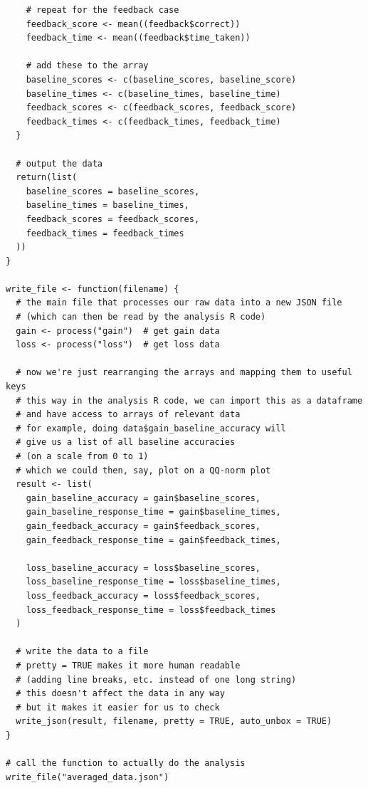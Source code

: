 \documentclass[12pt]{exam}
\begin{document}
\begin{verbatim}
    # repeat for the feedback case
    feedback_score <- mean((feedback$correct))
    feedback_time <- mean((feedback$time_taken))
    
    # add these to the array
    baseline_scores <- c(baseline_scores, baseline_score)
    baseline_times <- c(baseline_times, baseline_time)
    feedback_scores <- c(feedback_scores, feedback_score)
    feedback_times <- c(feedback_times, feedback_time)
  }
  
  # output the data
  return(list(
    baseline_scores = baseline_scores,
    baseline_times = baseline_times,
    feedback_scores = feedback_scores,
    feedback_times = feedback_times
  ))
}

write_file <- function(filename) {
  # the main file that processes our raw data into a new JSON file
  # (which can then be read by the analysis R code)
  gain <- process("gain")  # get gain data
  loss <- process("loss")  # get loss data
  
  # now we're just rearranging the arrays and mapping them to useful keys
  # this way in the analysis R code, we can import this as a dataframe
  # and have access to arrays of relevant data
  # for example, doing data$gain_baseline_accuracy will
  # give us a list of all baseline accuracies
  # (on a scale from 0 to 1)
  # which we could then, say, plot on a QQ-norm plot
  result <- list(
    gain_baseline_accuracy = gain$baseline_scores,
    gain_baseline_response_time = gain$baseline_times,
    gain_feedback_accuracy = gain$feedback_scores,
    gain_feedback_response_time = gain$feedback_times,
    
    loss_baseline_accuracy = loss$baseline_scores,
    loss_baseline_response_time = loss$baseline_times,
    loss_feedback_accuracy = loss$feedback_scores,
    loss_feedback_response_time = loss$feedback_times
  )
  
  # write the data to a file
  # pretty = TRUE makes it more human readable
  # (adding line breaks, etc. instead of one long string)
  # this doesn't affect the data in any way
  # but it makes it easier for us to check
  write_json(result, filename, pretty = TRUE, auto_unbox = TRUE)
}

# call the function to actually do the analysis
write_file("averaged_data.json")
\end{verbatim}
\end{document}
